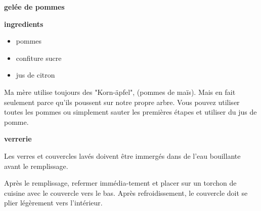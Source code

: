

\parindent0pt	

\pagestyle{empty}


\textbf{{\LARGE gelée de pommes}}%

\hrulefill

\vspace{0.5cm}

\begin{multicols}{2}
\textbf{ingredients}
\begin{itemize}

\item pommes 
\item confiture sucre
\item jus de citron

\vspace*{\fill}
\end{itemize}
\columnbreak
Ma mère utilise toujours des "Korn-äpfel", (pommes de maïs). Mais en fait seulement parce qu'ils poussent sur notre propre arbre.
Vous pouvez utiliser toutes les pommes ou simplement sauter les premières étapes et utiliser du jus de pomme. 
\end{multicols}

\vspace{0.5cm}
\textbf{verrerie}
\begin{multicols}{2}

Les verres et couvercles lavés doivent être immergés dans de l'eau bouillante avant le remplissage.
\columnbreak

Après le remplissage, refermer immédia-tement et placer sur un torchon de cuisine avec le couvercle vers le bas. Après refroidissement, le couvercle doit se plier légèrement vers l'intérieur.

\end{multicols}
\vfill									%

